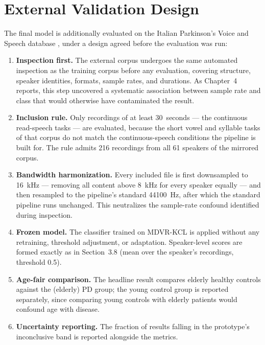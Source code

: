 \section{External Validation Design}

The final model is additionally evaluated on the Italian Parkinson's
Voice and Speech database \cite{dimauro2017}, under a design agreed
before the evaluation was run:

\begin{enumerate}
  \item \textbf{Inspection first.} The external corpus undergoes the
        same automated inspection as the training corpus before any
        evaluation, covering structure, speaker identities, formats,
        sample rates, and durations. As Chapter~4 reports, this step
        uncovered a systematic association between sample rate and
        class that would otherwise have contaminated the result.
  \item \textbf{Inclusion rule.} Only recordings of at least
        30~seconds --- the continuous read-speech tasks --- are
        evaluated, because the short vowel and syllable tasks of that
        corpus do not match the continuous-speech conditions the
        pipeline is built for. The rule admits 216 recordings from all
        61 speakers of the mirrored corpus.
  \item \textbf{Bandwidth harmonization.} Every included file is first
        downsampled to 16~kHz --- removing all content above 8~kHz for
        every speaker equally --- and then resampled to the pipeline's
        standard 44100~Hz, after which the standard pipeline runs
        unchanged. This neutralizes the sample-rate confound
        identified during inspection.
  \item \textbf{Frozen model.} The classifier trained on MDVR-KCL is
        applied without any retraining, threshold adjustment, or
        adaptation. Speaker-level scores are formed exactly as in
        Section~3.8 (mean over the speaker's recordings, threshold
        0.5).
  \item \textbf{Age-fair comparison.} The headline result compares
        elderly healthy controls against the (elderly) PD group; the
        young control group is reported separately, since comparing
        young controls with elderly patients would confound age with
        disease.
  \item \textbf{Uncertainty reporting.} The fraction of results falling
        in the prototype's inconclusive band is reported alongside the
        metrics.
\end{enumerate}

